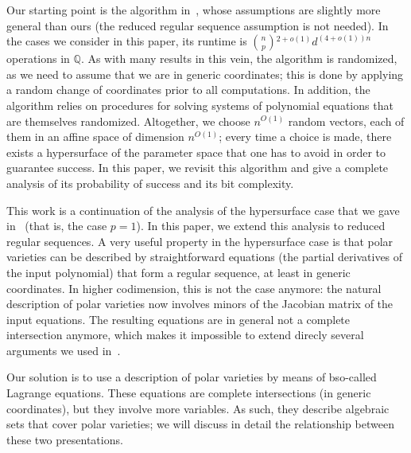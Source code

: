 \documentclass[12pt]{article}
\def\Q{\mathbb{Q}}
\begin{document}
Our starting point is the algorithm in~\cite{EMP}, whose assumptions
are slightly more general than ours (the  reduced regular sequence
assumption is not needed). In the cases we consider in this paper, its
runtime is ${ n \choose p}{}^{2+o(1)}d^{(4+o(1))n}$ operations in
$\Q$.  As with many results in this vein, the algorithm is randomized,
as we need to assume that we are in generic coordinates; this is done
by applying a random change of coordinates prior to all
computations. In addition, the algorithm relies on procedures for
solving systems of polynomial equations that are themselves
randomized.  Altogether, we choose $n^{O(1)}$ random vectors, each of
them in an affine space of dimension $n^{O(1)}$; every time a choice
is made, there exists a hypersurface of the parameter space that one
has to avoid in order to guarantee success. In this paper, we revisit
this algorithm and give a complete analysis of its probability of
success and its bit complexity.

This work is a continuation of the analysis of the hypersurface case
that we gave in~\cite{ElGiSc20} (that is, the case $p=1$). In this
paper, we extend this analysis to reduced regular sequences. A very
useful property in the hypersurface case is that polar varieties can
be described by straightforward equations (the partial derivatives of
the input polynomial) that form a regular sequence, at least in
generic coordinates. In higher codimension, this is not the case
anymore: the natural description of polar varieties now involves
minors of the Jacobian matrix of the input equations. The resulting
equations are in general not a complete intersection anymore, which
makes it impossible to extend direcly several arguments we used
in~\cite{ElGiSc20}. 

Our solution is to use a description of polar varieties by means of
bso-called Lagrange equations. These equations are complete
intersections (in generic coordinates), but they involve more
variables. As such, they describe algebraic sets that cover polar
varieties; we will discuss in detail the relationship between these
two presentations.
\end{document}
